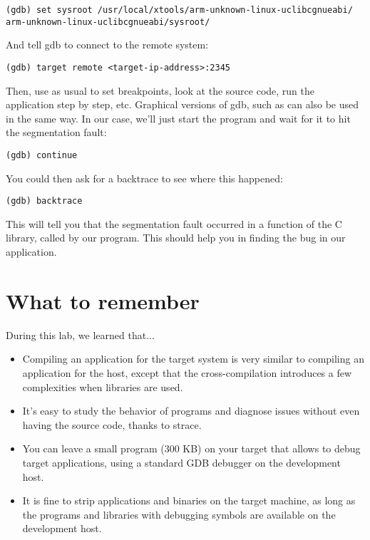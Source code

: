 \begin{verbatim}
(gdb) set sysroot /usr/local/xtools/arm-unknown-linux-uclibcgnueabi/
arm-unknown-linux-uclibcgnueabi/sysroot/
\end{verbatim}

And tell gdb to connect to the remote system:
\begin{verbatim}
(gdb) target remote <target-ip-address>:2345
\end{verbatim}

Then, use  as usual to set breakpoints, look at the source
code, run the application step by step, etc. Graphical versions of
gdb, such as  can also be used in the same way. In our case,
we'll just start the program and wait for it to hit the segmentation
fault:
\begin{verbatim}
(gdb) continue
\end{verbatim}

You could then ask for a backtrace to see where this happened:
\begin{verbatim}
(gdb) backtrace
\end{verbatim}

This will tell you that the segmentation fault occurred in a function
of the C library, called by our program. This should help you in
finding the bug in our application.

\section{What to remember}

During this lab, we learned that...
\begin{itemize}
\item Compiling an application for the target system is very similar
  to compiling an application for the host, except that the
  cross-compilation introduces a few complexities when libraries are
  used.

\item It's easy to study the behavior of programs and diagnose issues
  without even having the source code, thanks to strace.

\item You can leave a small  program (300 KB) on your target
  that allows to debug target applications, using a standard GDB
  debugger on the development host.

\item It is fine to strip applications and binaries on the target
  machine, as long as the programs and libraries with debugging
  symbols are available on the development host.

\end{itemize}

